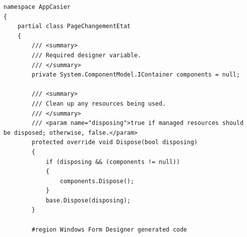 \documentclass[main.tex]{subfiles}
\begin{document}
\begin{lstlisting}
namespace AppCasier
{
    partial class PageChangementEtat
    {
        /// <summary>
        /// Required designer variable.
        /// </summary>
        private System.ComponentModel.IContainer components = null;

        /// <summary>
        /// Clean up any resources being used.
        /// </summary>
        /// <param name="disposing">true if managed resources should be disposed; otherwise, false.</param>
        protected override void Dispose(bool disposing)
        {
            if (disposing && (components != null))
            {
                components.Dispose();
            }
            base.Dispose(disposing);
        }

        #region Windows Form Designer generated code


\end{lstlisting}
\end{document}
